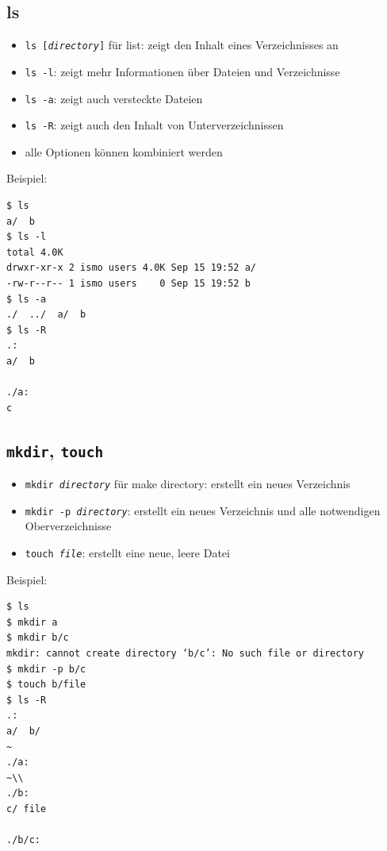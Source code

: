 \subsection{ls}
\begin{itemize}
  \item \texttt{ls [\textit{directory}]} für list: zeigt den Inhalt eines Verzeichnisses an
  \item \texttt{ls -l}: zeigt mehr Informationen über Dateien und Verzeichnisse
  \item \texttt{ls -a}: zeigt auch versteckte Dateien
  \item \texttt{ls -R}: zeigt auch den Inhalt von Unterverzeichnissen
  \item alle Optionen können kombiniert werden
\end{itemize}
Beispiel:
\begin{verbatim}
$ ls
a/  b
$ ls -l
total 4.0K
drwxr-xr-x 2 ismo users 4.0K Sep 15 19:52 a/
-rw-r--r-- 1 ismo users    0 Sep 15 19:52 b
$ ls -a
./  ../  a/  b
$ ls -R
.:
a/  b

./a:
c
\end{verbatim}

\subsection{\texttt{mkdir}, \texttt{touch}}
\begin{itemize}
  \item \texttt{mkdir \textit{directory}} für make directory: erstellt ein neues Verzeichnis
  \item \texttt{mkdir -p \textit{directory}}: erstellt ein neues Verzeichnis und alle notwendigen Oberverzeichnisse
  \item \texttt{touch \textit{file}}: erstellt eine neue, leere Datei
\end{itemize}
Beispiel:
\begin{verbatim}
$ ls
$ mkdir a
$ mkdir b/c
mkdir: cannot create directory ‘b/c’: No such file or directory
$ mkdir -p b/c
$ touch b/file
$ ls -R
.:
a/  b/
~
./a:
~\\                  
./b:
c/ file

./b/c:
\end{verbatim}

